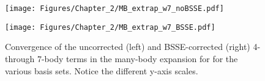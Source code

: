 \begin{figure}[h]
\uwsinglespace
\begin{center}
\begin{minipage}{0.45\textwidth}
\texttt{[image: Figures/Chapter\_2/MB\_extrap\_w7\_noBSSE.pdf]}
\end{minipage}
\begin{minipage}{0.45\textwidth}
\texttt{[image: Figures/Chapter\_2/MB\_extrap\_w7\_BSSE.pdf]}
\end{minipage}
\end{center}
\caption[Convergence of the uncorrected (left) and BSSE-corrected (right) 4- through 7-body terms in the many-body expansion for  for the various basis sets. Notice the different y-axis scales.]{Convergence of the uncorrected (left) and BSSE-corrected (right) 4- through 7-body terms in the many-body expansion for  for the various basis sets. Notice the different y-axis scales.}
\label{fig:MBE_I_F4}
\end{figure}